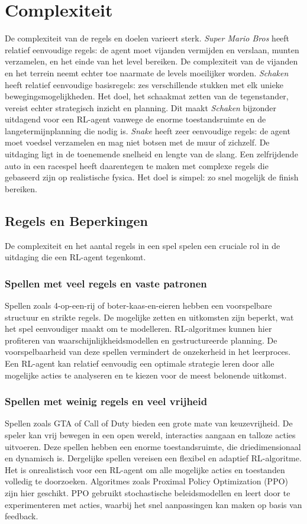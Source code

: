 \documentclass[a4paper,12pt]{report}
\begin{document}
\section{Complexiteit}
De complexiteit van de regels en doelen varieert sterk. \textit{Super Mario
    Bros} heeft relatief eenvoudige regels: de agent moet vijanden vermijden en
verslaan, munten verzamelen, en het einde van het level bereiken. De
complexiteit van de vijanden en het terrein neemt echter toe naarmate de levels
moeilijker worden. \textit{Schaken} heeft relatief eenvoudige basisregels: zes
verschillende stukken met elk unieke bewegingsmogelijkheden. Het doel, het
schaakmat zetten van de tegenstander, vereist echter strategisch inzicht en
planning. Dit maakt \textit{Schaken} bijzonder uitdagend voor een RL-agent
vanwege de enorme toestandsruimte en de langetermijnplanning die nodig is.
\textit{Snake} heeft zeer eenvoudige regels: de agent moet voedsel verzamelen
en mag niet botsen met de muur of zichzelf. De uitdaging ligt in de toenemende
snelheid en lengte van de slang. Een zelfrijdende auto in een racespel heeft
daarentegen te maken met complexe regels die gebaseerd zijn op realistische
fysica. Het doel is simpel: zo snel mogelijk de finish bereiken.

\subsection{Regels en Beperkingen}
De complexiteit en het aantal regels in een spel spelen een cruciale rol in de
uitdaging die een RL-agent tegenkomt.

\subsubsection{Spellen met veel regels en vaste patronen}
Spellen zoals 4-op-een-rij of boter-kaas-en-eieren hebben een voorspelbare
structuur en strikte regels. De mogelijke zetten en uitkomsten zijn beperkt,
wat het spel eenvoudiger maakt om te modelleren. RL-algoritmes kunnen hier
profiteren van waarschijnlijkheidsmodellen en gestructureerde planning. De
voorspelbaarheid van deze spellen vermindert de onzekerheid in het leerproces.
Een RL-agent kan relatief eenvoudig een optimale strategie leren door alle
mogelijke acties te analyseren en te kiezen voor de meest belonende uitkomst.

\subsubsection{Spellen met weinig regels en veel vrijheid}
Spellen zoals GTA of Call of Duty bieden een grote mate van keuzevrijheid. De
speler kan vrij bewegen in een open wereld, interacties aangaan en talloze
acties uitvoeren. Deze spellen hebben een enorme toestandsruimte, die
driedimensionaal en dynamisch is. Dergelijke spellen vereisen een flexibel en
adaptief RL-algoritme. Het is onrealistisch voor een RL-agent om alle mogelijke
acties en toestanden volledig te doorzoeken. Algoritmes zoals Proximal Policy
Optimization (PPO) zijn hier geschikt. PPO gebruikt stochastische
beleidsmodellen en leert door te experimenteren met acties, waarbij het snel
aanpassingen kan maken op basis van feedback.
\end{document}
